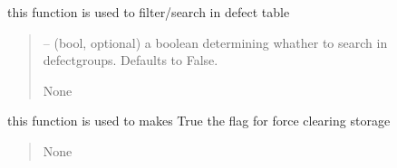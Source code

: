 \documentclass[letterpaper,10pt,english]{sphinxmanual}
\begin{document}
\begin{savenotes}
\begin{fulllineitems}
\begin{savenotes}
\begin{fulllineitems}
\end{fulllineitems}\end{savenotes}


\begin{savenotes}\begin{fulllineitems}
\label{\detokenize{setting/setting_api:oxin.setting_api.API.filter_defects}}
\pysigstartsignatures
{}
\pysigstopsignatures
\sphinxAtStartPar
this function is used to filter/search in defect table
\begin{quote}\begin{description}
\sphinxAtStartPar
{} – (bool, optional) a boolean determining whather to search in defect\sphinxhyphen{}groups. Defaults to False.

\sphinxAtStartPar
None

\end{description}\end{quote}

\end{fulllineitems}\end{savenotes}


\begin{savenotes}\begin{fulllineitems}
\label{\detokenize{setting/setting_api:oxin.setting_api.API.force_clear_camera_live_storage}}
\pysigstartsignatures
{}
\pysigstopsignatures
\sphinxAtStartPar
this function is used to makes True the flag for force clearing storage
\begin{quote}\begin{description}
\sphinxAtStartPar
None

\end{description}\end{quote}

\end{fulllineitems}\end{savenotes}


\end{fulllineitems}
\end{savenotes}
\end{document}
